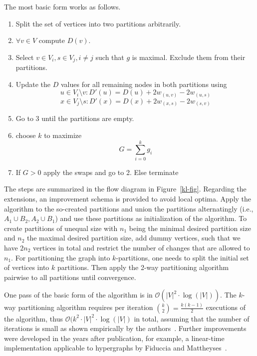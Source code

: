             The most basic form works as follows.
            \begin{enumerate}
                \item Split the set of vertices into two partitions arbitrarily.
                \item $\forall v \in V$ compute $D(v)$.
                \item Select $v \in V_i, s \in V_j, i \neq j$ such that $g$ is maximal. Exclude them from their partitions.
                \item Update the $D$ values for all remaining nodes in both partitions using 
                \[ u \in V_i \setminus {v}: D'(u) = D(u) + 2 w_{(u, v)} - 2 w_{(u, s)} \]
                \[ x \in V_j \setminus {s}: D'(x) = D(x) + 2 w_{(x, s)} - 2 w_{(s, v)} \]
                \item Go to 3 until the partitions are empty.
                \item choose $k$ to maximize 
                \[ G = \sum^k_{i = 0} g_i \]
                \item If $G > 0$ apply the swaps and go to 2. Else terminate
            \end{enumerate}
            The steps are summarized in the flow diagram in Figure~\ref{kl-fig}.
            Regarding the extensions, an improvement schema is provided to avoid local optima.
            Apply the algorithm to the so-created partitions and union the partitions alternatingly (i.e., $A_1 \cup B_2, A_2 \cup B_1$) and use these partitions as initialization of the algorithm.
            To create partitions of unequal size with $n_1$ being the minimal desired partition size and $n_2$ the maximal desired partition size, add dummy vertices, such that we have $2n_2$ vertices in total and restrict the number of changes that are allowed to $n_1$.
            For partitioning the graph into $k$-partitions, one needs to split the initial set of vertices into $k$ partitions. 
            Then apply the 2-way partitioning algorithm pairwise to all partitions until convergence.
            
            One pass of the basic form of the algorithm is in $\mathcal{O}(|V|^2 \cdot \log(|V|))$. The $k$-way partitioning algorithm requires per iteration $\binom{k}{2} = \frac{k (k - 1)}{2}$ executions of the algorithm, thus $\mathcal{O}(k^2 \cdot |V|^2 \cdot \log(|V|)$ in total, assuming that the number of iterations is small as shown empirically by the authors~\autocite{kl}. Further improvements were developed in the years after publication, for example, a linear-time implementation applicable to hypergraphs by Fiduccia and Mattheyses~\autocite{fm}.

